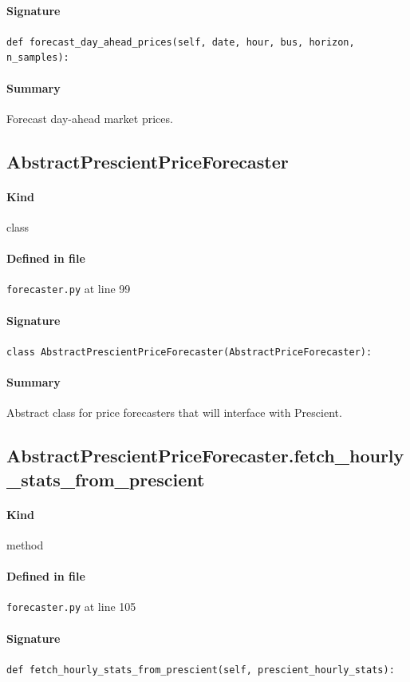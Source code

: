 \documentclass[11pt]{report}
\begin{document}
\paragraph{Signature} \texttt{def forecast\_day\_ahead\_prices(self, date, hour, bus, horizon, n\_samples):}
\paragraph{Summary} Forecast day-ahead market prices.
\subsection{AbstractPrescientPriceForecaster}
\label{def:forecaster.py:AbstractPrescientPriceForecaster:L99}
\paragraph{Kind} class
\paragraph{Defined in file} \texttt{forecaster.py} at line 99
\paragraph{Signature} \texttt{class AbstractPrescientPriceForecaster(AbstractPriceForecaster):}
\paragraph{Summary} Abstract class for price forecasters that will interface with Prescient.
\subsection{AbstractPrescientPriceForecaster.fetch\_hourly\_stats\_from\_prescient}
\label{def:forecaster.py:AbstractPrescientPriceForecaster.fetch_hourly_stats_from_prescient:L105}
\paragraph{Kind} method
\paragraph{Defined in file} \texttt{forecaster.py} at line 105
\paragraph{Signature} \texttt{def fetch\_hourly\_stats\_from\_prescient(self, prescient\_hourly\_stats):}
\end{document}
